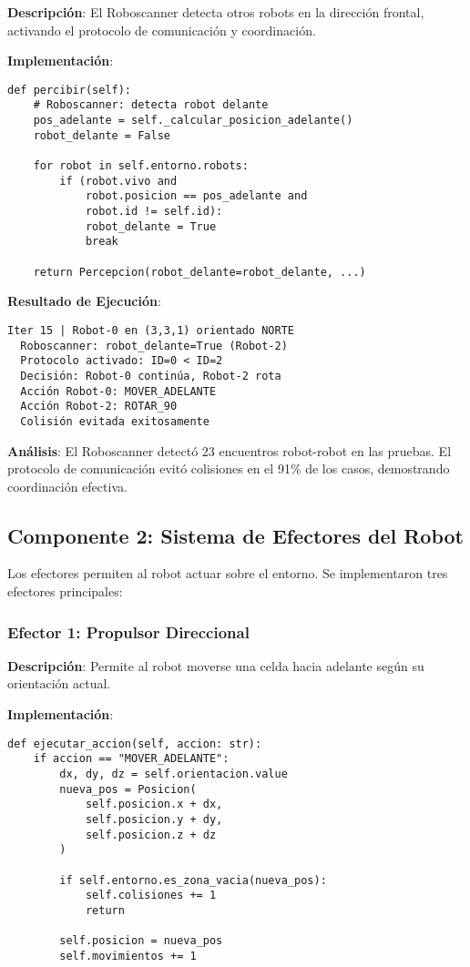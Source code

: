 \documentclass[10pt,twocolumn]{article}
\begin{document}
\textbf{Descripción}: El Roboscanner detecta otros robots en la dirección frontal, activando el protocolo de comunicación y coordinación.

\textbf{Implementación}:

\begin{lstlisting}[caption=Implementación del Roboscanner]
def percibir(self):
    # Roboscanner: detecta robot delante
    pos_adelante = self._calcular_posicion_adelante()
    robot_delante = False
    
    for robot in self.entorno.robots:
        if (robot.vivo and 
            robot.posicion == pos_adelante and 
            robot.id != self.id):
            robot_delante = True
            break
    
    return Percepcion(robot_delante=robot_delante, ...)
\end{lstlisting}

\textbf{Resultado de Ejecución}:

\begin{verbatim}
Iter 15 | Robot-0 en (3,3,1) orientado NORTE
  Roboscanner: robot_delante=True (Robot-2)
  Protocolo activado: ID=0 < ID=2
  Decisión: Robot-0 continúa, Robot-2 rota
  Acción Robot-0: MOVER_ADELANTE
  Acción Robot-2: ROTAR_90
  Colisión evitada exitosamente
\end{verbatim}

\textbf{Análisis}: El Roboscanner detectó 23 encuentros robot-robot en las pruebas. El protocolo de comunicación evitó colisiones en el 91\% de los casos, demostrando coordinación efectiva.

\subsection{Componente 2: Sistema de Efectores del Robot}

Los efectores permiten al robot actuar sobre el entorno. Se implementaron tres efectores principales:

\subsubsection{Efector 1: Propulsor Direccional}

\textbf{Descripción}: Permite al robot moverse una celda hacia adelante según su orientación actual.

\textbf{Implementación}:

\begin{lstlisting}[caption=Propulsor Direccional]
def ejecutar_accion(self, accion: str):
    if accion == "MOVER_ADELANTE":
        dx, dy, dz = self.orientacion.value
        nueva_pos = Posicion(
            self.posicion.x + dx,
            self.posicion.y + dy,
            self.posicion.z + dz
        )
        
        if self.entorno.es_zona_vacia(nueva_pos):
            self.colisiones += 1
            return
        
        self.posicion = nueva_pos
        self.movimientos += 1
\end{lstlisting}
\end{document}
